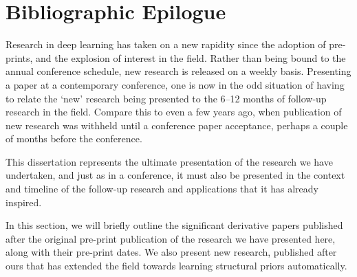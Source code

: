 \documentclass[thesis]{subfiles}
\begin{document}

\chapter{Bibliographic Epilogue}
\label{epilogue}
Research in deep learning has taken on a new rapidity since the adoption of pre-prints, and the explosion of interest in the field. Rather than being bound to the annual conference schedule, new research is released on a weekly basis. Presenting a paper at a contemporary conference, one is now in the odd situation of having to relate the `new' research being presented to the 6--12 months of follow-up research in the field. Compare this to even a few years ago, when publication of new research was withheld until a conference paper acceptance, perhaps a couple of months before the conference.

This dissertation represents the ultimate presentation of the research we have undertaken, and just as in a conference, it must also be presented in the context and timeline of the follow-up research and applications that it has already inspired.

In this section, we will briefly outline the significant derivative papers published after the original pre-print publication of the research we have presented here, along with their pre-print dates. We also present new research, published after ours that has extended the field towards learning structural priors automatically. 
\end{document}
